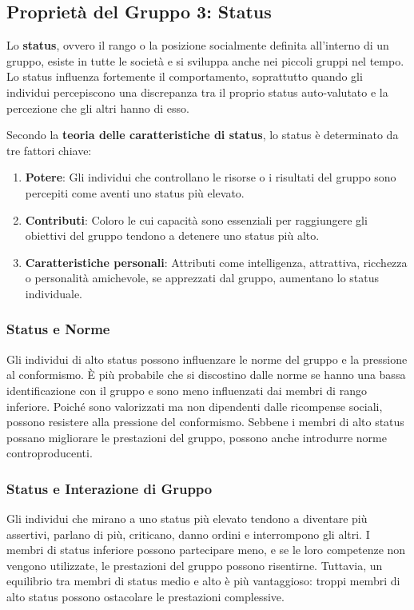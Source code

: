 \documentclass{article}
\begin{document}
\subsection{Proprietà del Gruppo 3: Status}

Lo \textbf{status}, ovvero il rango o la posizione socialmente definita all'interno di un gruppo, esiste in tutte le società e si sviluppa anche nei piccoli gruppi nel tempo. Lo status influenza fortemente il comportamento, soprattutto quando gli individui percepiscono una discrepanza tra il proprio status auto-valutato e la percezione che gli altri hanno di esso.

Secondo la \textbf{teoria delle caratteristiche di status}, lo status è determinato da tre fattori chiave:
\begin{enumerate}
    \item \textbf{Potere}: Gli individui che controllano le risorse o i risultati del gruppo sono percepiti come aventi uno status più elevato.
    \item \textbf{Contributi}: Coloro le cui capacità sono essenziali per raggiungere gli obiettivi del gruppo tendono a detenere uno status più alto.
    \item \textbf{Caratteristiche personali}: Attributi come intelligenza, attrattiva, ricchezza o personalità amichevole, se apprezzati dal gruppo, aumentano lo status individuale.
\end{enumerate}

\subsubsection{Status e Norme}

Gli individui di alto status possono influenzare le norme del gruppo e la pressione al conformismo. È più probabile che si discostino dalle norme se hanno una bassa identificazione con il gruppo e sono meno influenzati dai membri di rango inferiore. Poiché sono valorizzati ma non dipendenti dalle ricompense sociali, possono resistere alla pressione del conformismo. Sebbene i membri di alto status possano migliorare le prestazioni del gruppo, possono anche introdurre norme controproducenti.

\subsubsection{Status e Interazione di Gruppo}

Gli individui che mirano a uno status più elevato tendono a diventare più assertivi, parlano di più, criticano, danno ordini e interrompono gli altri. I membri di status inferiore possono partecipare meno, e se le loro competenze non vengono utilizzate, le prestazioni del gruppo possono risentirne. Tuttavia, un equilibrio tra membri di status medio e alto è più vantaggioso: troppi membri di alto status possono ostacolare le prestazioni complessive.
\end{document}
